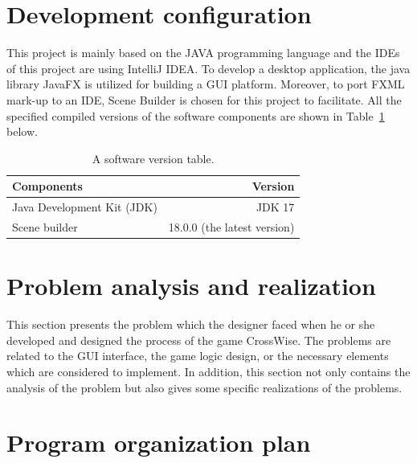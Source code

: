 \section{Development configuration}

This project is mainly based on the JAVA programming language and the IDEs of this project are using IntelliJ IDEA. To develop a desktop application,  the java library JavaFX is utilized for building a GUI platform. Moreover, to port FXML mark-up to an IDE, Scene Builder is chosen for this project to facilitate. All the specified compiled versions of the software components are shown in Table~\ref{tab:software version} below. 

\begin{table}[h]
	\centering
	\begin{tabular}{l|r}
		\toprule
		Components & Version \\
		\midrule
		Java Development Kit (JDK) & JDK 17 \\
		Scene builder & 18.0.0 (the latest version)\\
		\bottomrule
	\end{tabular}
	\caption{A software version table.}
	\label{tab:software version}
\end{table}

\section{Problem analysis and realization}

This section presents the problem which the designer faced when he or she developed and designed the process of the game CrossWise. The problems are related to the GUI interface, the game logic design, or the necessary elements which are considered to implement. In addition, this section not only contains the analysis of the problem but also gives some specific realizations of the problems.
\newpage













\newpage

    
\section{Program organization plan}


